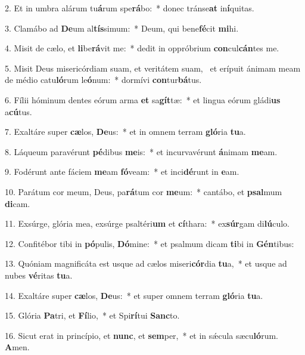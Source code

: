 2. Et in umbra alárum tu\textbf{á}rum spe\textbf{rá}bo:~*  donec tránse\textbf{at} in\textbf{í}quitas.\

3. Clamábo ad \textbf{De}um al\textbf{tís}simum:~*  Deum, qui bene\textbf{fé}cit \textbf{mi}hi.\

4. Misit de cælo, et \textbf{li}be\textbf{rá}vit me:~*  dedit in oppróbrium \textbf{con}cul\textbf{cán}tes me.\

5. Misit Deus misericórdiam suam, et veritátem suam, \dag\  et erípuit ánimam meam de médio catu\textbf{ló}rum le\textbf{ó}num:~*  dormívi \textbf{con}tur\textbf{bá}tus.\

6. Fílii hóminum dentes eórum arma \textbf{et} sa\textbf{gít}tæ:~*  et lingua eórum gládi\textbf{us} a\textbf{cú}tus.\

7. Exaltáre super \textbf{cæ}los, \textbf{De}us:~*  et in omnem terram \textbf{gló}ria \textbf{tu}a.\

8. Láqueum paravérunt \textbf{pé}dibus \textbf{me}is:~*  et incurvavérunt \textbf{á}nimam \textbf{me}am.\

9. Fodérunt ante fáciem \textbf{me}am \textbf{fó}veam:~*  et inci\textbf{dé}runt in \textbf{e}am.\

10. Parátum cor meum, Deus, pa\textbf{rá}tum cor \textbf{me}um:~*  cantábo, et \textbf{psal}mum \textbf{di}cam.\

11. Exsúrge, glória mea, exsúrge psaltéri\textbf{um} et \textbf{cí}thara:~*  ex\textbf{súr}gam di\textbf{lú}culo.\

12. Confitébor tibi in \textbf{pó}pulis, \textbf{Dó}mine:~*  et psalmum dicam \textbf{ti}bi in \textbf{Gén}tibus:\

13. Quóniam magnificáta est usque ad cælos miseri\textbf{cór}dia \textbf{tu}a,~*  et usque ad nubes \textbf{vé}ritas \textbf{tu}a.\

14. Exaltáre super \textbf{cæ}los, \textbf{De}us:~*  et super omnem terram \textbf{gló}ria \textbf{tu}a.\

15. Glória \textbf{Pa}tri, et \textbf{Fí}lio,~*  et Spi\textbf{rí}tui \textbf{Sanc}to.\

16. Sicut erat in princípio, et \textbf{nunc}, et \textbf{sem}per,~*  et in sǽcula sæcu\textbf{ló}rum. \textbf{A}men.\

